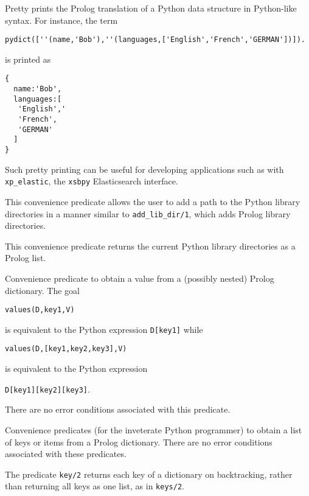 \begin{description}
%
Pretty prints the Prolog translation of a Python data structure in
Python-like syntax.  For instance, the term

\begin{verbatim}
pydict([''(name,'Bob'),''(languages,['English','French','GERMAN'])]).
\end{verbatim}

\noindent
is printed as 
\begin{verbatim}
{
  name:'Bob',
  languages:[
   'English','
   'French',
   'GERMAN'
  ]
} 
\end{verbatim}

Such pretty printing can be useful for developing applications such as
with {\tt xp\_elastic}, the {\tt xsbpy} Elasticsearch interface.

%
This convenience predicate allows the user to add a path to the Python
library directories in a manner similar to {\tt add\_lib\_dir/1},
which adds Prolog library directories.

%
This convenience predicate returns the current Python library
directories as a Prolog list.

%
  Convenience predicate to obtain a value from a (possibly nested)
  Prolog dictionary.  The goal

  {\tt values(D,key1,V)}

\noindent
  is equivalent to the
  Python expression {\tt D[key1]} while

  {\tt values(D,[key1,key2,key3],V)}

\noindent
is equivalent to the Python expression

{\tt D[key1][key2][key3]}.

There are no error conditions associated with this predicate.

%
Convenience predicates (for the inveterate Python programmer) to
obtain a list of keys or items from a Prolog dictionary.  There are no
error conditions associated with these predicates.

The predicate {\tt key/2} returns each key of a dictionary on
backtracking, rather than returning all keys as one list, as in {\tt keys/2}.




\end{description}
